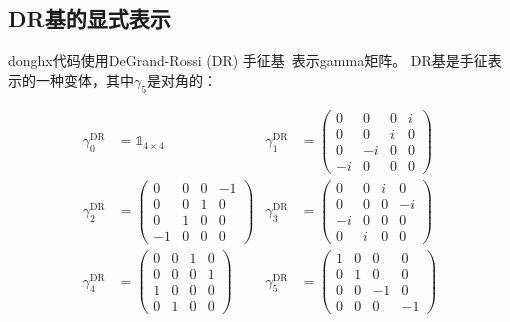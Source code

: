 \documentclass[12pt,a4paper]{ctexart}
\begin{document}
\subsection{DR基的显式表示}

donghx代码使用DeGrand-Rossi (DR) 手征基~\cite{DeGrand_Rossi}表示gamma矩阵。
DR基是手征表示的一种变体，其中$\gamma_5$是对角的：

\begin{physbox}[DR基Gamma矩阵]
\begin{align}
    \gamma_0^{\text{DR}} &= \mathbb{1}_{4\times4} &
    \gamma_1^{\text{DR}} &= \begin{pmatrix}
        0 & 0 & 0 & i \\
        0 & 0 & i & 0 \\
        0 & -i & 0 & 0 \\
        -i & 0 & 0 & 0
    \end{pmatrix} \\[0.3cm]
    \gamma_2^{\text{DR}} &= \begin{pmatrix}
        0 & 0 & 0 & -1 \\
        0 & 0 & 1 & 0 \\
        0 & 1 & 0 & 0 \\
        -1 & 0 & 0 & 0
    \end{pmatrix} &
    \gamma_3^{\text{DR}} &= \begin{pmatrix}
        0 & 0 & i & 0 \\
        0 & 0 & 0 & -i \\
        -i & 0 & 0 & 0 \\
        0 & i & 0 & 0
    \end{pmatrix} \\[0.3cm]
    \gamma_4^{\text{DR}} &= \begin{pmatrix}
        0 & 0 & 1 & 0 \\
        0 & 0 & 0 & 1 \\
        1 & 0 & 0 & 0 \\
        0 & 1 & 0 & 0
    \end{pmatrix} &
    \gamma_5^{\text{DR}} &= \begin{pmatrix}
        1 & 0 & 0 & 0 \\
        0 & 1 & 0 & 0 \\
        0 & 0 & -1 & 0 \\
        0 & 0 & 0 & -1
    \end{pmatrix}
\end{align}
\end{physbox}
\end{document}
